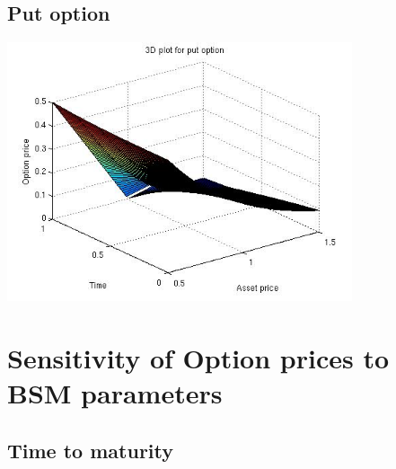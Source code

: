 \documentclass[12pt]{article}
\begin{document}
  \subsection*{Put option}
    \begin{center}
      \includegraphics[width=4in]{putsurf.jpg}
    \end{center}

\newpage
\section{Sensitivity of Option prices to BSM parameters}
  \subsection*{Time to maturity}
\end{document}
